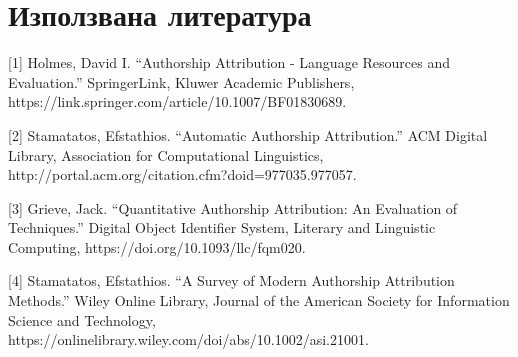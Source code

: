 \documentclass[12pt]{article}
\begin{document}
\section{Използвана литература}


[1] Holmes, David I. “Authorship Attribution - Language Resources and Evaluation.” SpringerLink, Kluwer Academic Publishers, https://link.springer.com/article/10.1007/BF01830689. 

[2] Stamatatos, Efstathios. “Automatic Authorship Attribution.” ACM Digital Library, Association for Computational Linguistics, http://portal.acm.org/citation.cfm?doid=977035.977057. 

[3] Grieve, Jack. “Quantitative Authorship Attribution: An Evaluation of Techniques.” Digital Object Identifier System, Literary and Linguistic Computing, https://doi.org/10.1093/llc/fqm020. 

[4] Stamatatos, Efstathios. “A Survey of Modern Authorship Attribution Methods.” Wiley Online Library, Journal of the American Society for Information Science and Technology, https://onlinelibrary.wiley.com/doi/abs/10.1002/asi.21001. 



\listoffigures
\end{document}
